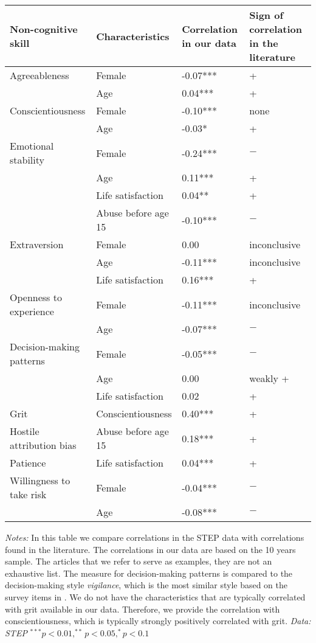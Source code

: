 \begin{threeparttable}
	\begin{tabular}{llp{2cm}p{2.2cm}}
		\hline%
		\hline%
		Non{-}cognitive skill & Characteristics & Correlation in our data & Sign of correlation in the literature \\%
		\hline%
		Agreeableness & Female & {-}0.07*** & +\tnote{(a)}\\
		& Age & 0.04*** & +\tnote{(b)}\\%
		Conscientiousness & Female & {-}0.10*** & none\tnote{(a)}\\
		& Age & {-}0.03* & +\tnote{(b)}\\%
		Emotional stability & Female & {-}0.24*** & $-$\tnote{(a)}\\
		& Age & 0.11*** & +\tnote{(b)}\\
		& Life satisfaction & 0.04** & +\tnote{(c)}\\
		& Abuse before age 15 & {-}0.10*** & $-$\tnote{(d)}\\%
		Extraversion & Female & 0.00 & inconclusive\tnote{(a)}\\
		& Age & {-}0.11*** & inconclusive\tnote{(b)}\\
		& Life satisfaction & 0.16*** & +\tnote{(e)}\\%
		Openness to experience & Female & {-}0.11*** & inconclusive\tnote{(a)}\\
		& Age & {-}0.07*** & $-$\tnote{(b)}\\%
		Decision{-}making patterns & Female & {-}0.05*** & $-$\tnote{(f)}\\
		& Age & 0.00 & weakly +\tnote{(g)}\\
		& Life satisfaction & 0.02 & +\tnote{(h)}\\%
		Grit & Conscientiousness & 0.40*** & +\tnote{(i)}\\%
		Hostile attribution bias & Abuse before age 15 & 0.18*** & +\tnote{(j)}\\%
		Patience & Life satisfaction & 0.04*** & +\tnote{(k)}\\%
		Willingness to take risk & Female & {-}0.04*** & $-$\tnote{(l)}\\
		& Age & {-}0.08*** & $-$\tnote{(l)}\\%
		\hline%
		\hline%
	\end{tabular}
	\begin{tablenotes}
		\footnotesize
		\item \textit{Notes:} In this table we compare correlations in the STEP data with correlations found in the literature. The correlations in our data are based on the 10 years sample. The articles that we refer to serve as examples, they are not an exhaustive list. The measure for decision-making patterns is compared to the decision-making style \textit{vigilance}, which is the most similar style based on the survey items in \citet{mann_melbourne_1997}. We do not have the characteristics that are typically correlated with grit \parencite[as described in][]{alan_ever_2019} available in our data. Therefore, we provide the correlation with conscientiousness, which is typically strongly positively correlated with grit. \textit{Data: STEP} $^{***} p < 0.01, ^{**} p < 0.05, ^{*} p < 0.1$

\end{tablenotes}
\end{threeparttable}
